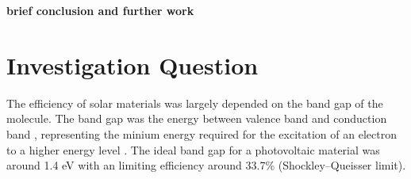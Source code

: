 \documentclass[twocolumn]{article} %
\begin{document}
\textbf{brief conclusion and further work} 











\section{Investigation Question}

The efficiency of solar materials was largely depended on the band gap of the molecule. The band gap was the energy between valence band and conduction band \cite{investigation}, representing the minium energy required for the excitation of an electron to a higher energy level \cite{Bandgap2020}. The ideal band gap for a photovoltaic material was around 1.4 eV with an limiting efficiency around 33.7\% (Shockley–Queisser limit). \cite{Bandgap1961} 
\end{document}
